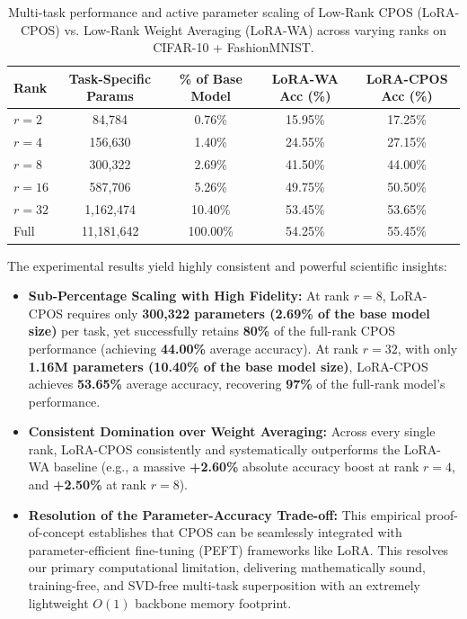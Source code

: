 \documentclass{article}
\theoremstyle{plain}
\theoremstyle{definition}
\theoremstyle{remark}
\begin{document}
\begin{table}[h]
\caption{Multi-task performance and active parameter scaling of Low-Rank CPOS (LoRA-CPOS) vs. Low-Rank Weight Averaging (LoRA-WA) across varying ranks on CIFAR-10 + FashionMNIST.}
\label{tab:lora_cpos}
\begin{center}
\begin{small}
\begin{sc}
\begin{tabular}{lcccc}
\toprule
Rank & Task-Specific Params & \% of Base Model & LoRA-WA Acc (\%) & LoRA-CPOS Acc (\%) \\
\midrule
$r=2$ & 84,784 & 0.76\% & 15.95\% & 17.25\% \\
$r=4$ & 156,630 & 1.40\% & 24.55\% & 27.15\% \\
$r=8$ & 300,322 & 2.69\% & 41.50\% & 44.00\% \\
$r=16$ & 587,706 & 5.26\% & 49.75\% & 50.50\% \\
$r=32$ & 1,162,474 & 10.40\% & 53.45\% & 53.65\% \\
Full & 11,181,642 & 100.00\% & 54.25\% & 55.45\% \\
\bottomrule
\end{tabular}
\end{sc}
\end{small}
\end{center}
\end{table}

The experimental results yield highly consistent and powerful scientific insights:
\begin{itemize}
\item \textbf{Sub-Percentage Scaling with High Fidelity:} At rank $r=8$, LoRA-CPOS requires only \textbf{300,322 parameters (2.69\% of the base model size)} per task, yet successfully retains \textbf{80\%} of the full-rank CPOS performance (achieving \textbf{44.00\%} average accuracy). At rank $r=32$, with only \textbf{1.16M parameters (10.40\% of the base model size)}, LoRA-CPOS achieves \textbf{53.65\%} average accuracy, recovering \textbf{97\%} of the full-rank model's performance.
\item \textbf{Consistent Domination over Weight Averaging:} Across every single rank, LoRA-CPOS consistently and systematically outperforms the LoRA-WA baseline (e.g., a massive \textbf{+2.60\%} absolute accuracy boost at rank $r=4$, and \textbf{+2.50\%} at rank $r=8$).
\item \textbf{Resolution of the Parameter-Accuracy Trade-off:} This empirical proof-of-concept establishes that CPOS can be seamlessly integrated with parameter-efficient fine-tuning (PEFT) frameworks like LoRA. This resolves our primary computational limitation, delivering mathematically sound, training-free, and SVD-free multi-task superposition with an extremely lightweight $O(1)$ backbone memory footprint.
\end{itemize}
\end{document}
